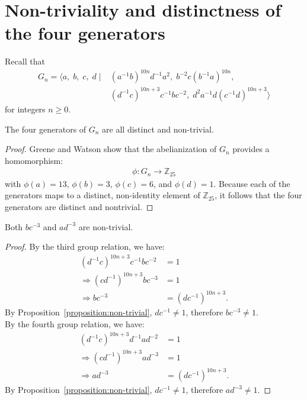 

\section{Non-triviality and distinctness of the four generators}
\label{section:identityProofs}

\noindent{}Recall that
\begin{align*}
G_n=\langle a,\; b,\; c,\; d \mid{} &(a^{-1}b)^{10n}d^{-1}a^{2},\; b^{-2}c(b^{-1}a)^{10n},\\
&(d^{-1}c)^{10n+3}c^{-1}bc^{-2},\; d^{2}a^{-1}d(c^{-1}d)^{10n+3} \rangle
\end{align*}
for integers $n\geq{}0$.

\vspace{10pt}

\begin{proposition}
The four generators of $G_n$ are all distinct and non-trivial.
\label{proposition:non-trivial}
\end{proposition}
\begin{proof}
Greene and Watson \cite[Section 4.2]{GreeneWatson} show that the abelianization of $G_n$ provides a homomorphism:
\begin{align*}
\phi:G_n\rightarrow \mathbb{Z}_{25}
\end{align*}
with $\phi(a)=13$, $\phi(b)=3$, $\phi(c)=6$, and $\phi(d)=1$. Because each of the generators maps to a distinct, non-identity element of $\mathbb{Z}_{25}$, it follows that the four generators are distinct and nontrivial.
\end{proof}

\begin{corollary}
Both $bc^{-3}$ and $ad^{-3}$ are non-trivial.
\label{corollary:non-trivial2}
\end{corollary}
\begin{proof}
By the third group relation, we have:
\begin{align*}
(d^{-1}c)^{10n+3}c^{-1}bc^{-2}&=1\\
\Rightarrow{}(cd^{-1})^{10n+3}bc^{-3}&=1\\
\Rightarrow{}bc^{-3}&=(dc^{-1})^{10n+3}.
\end{align*}
By Proposition~\ref{proposition:non-trivial}, $dc^{-1}\ne1$, therefore $bc^{-3}\ne1$.\\

\noindent{}By the fourth group relation, we have:
\begin{align*}
(d^{-1}c)^{10n+3}d^{-1}ad^{-2}&=1\\
\Rightarrow{}(cd^{-1})^{10n+3}ad^{-3}&=1\\
\Rightarrow{}ad^{-3}&=(dc^{-1})^{10n+3}.
\end{align*}
By Proposition~\ref{proposition:non-trivial}, $dc^{-1}\ne1$, therefore $ad^{-3}\ne1$.
\end{proof}

